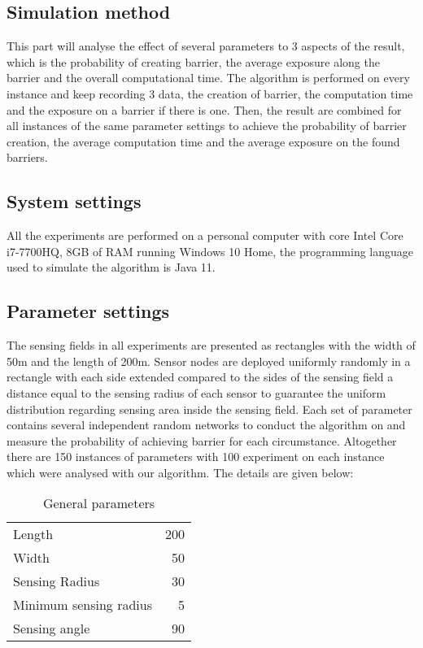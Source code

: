 
\subsection{Simulation method}

This part will analyse the effect of several parameters to 3 aspects of the result, which is the probability of creating barrier, the average exposure along the barrier and the overall computational time. The algorithm is performed on every instance and keep recording 3 data, the creation of barrier, the computation time and the exposure on a barrier if there is one. Then, the result are combined for all instances of the same parameter settings to achieve the probability of barrier creation, the average computation time and the average exposure on the found barriers.

\subsection{System settings}

All the experiments are performed on a personal computer with core Intel Core i7-7700HQ, 8GB of RAM running Windows 10 Home, the programming language used to simulate the algorithm is Java 11.

\subsection{Parameter settings}
The sensing fields in all experiments are presented as rectangles with the width of 50m and the length of 200m. Sensor nodes are deployed uniformly randomly in a rectangle with each side extended compared to the sides of the sensing field a distance equal to the sensing radius of each sensor to guarantee the uniform distribution regarding sensing area inside the sensing field. Each set of  parameter contains several independent random networks to conduct the algorithm on and measure the probability of achieving barrier for each circumstance. Altogether there are 150 instances of parameters with 100 experiment on each instance which were analysed with our algorithm. The details are given below:

\begin{table}[h!]
	\centering
	\begin{tabular}{l | r}
		Length & 200 \\
		Width & 50 \\
		Sensing Radius & 30 \\
		Minimum sensing radius & 5 \\
		Sensing angle & 90 \\
	\end{tabular}
	\caption{General parameters}
\end{table}


